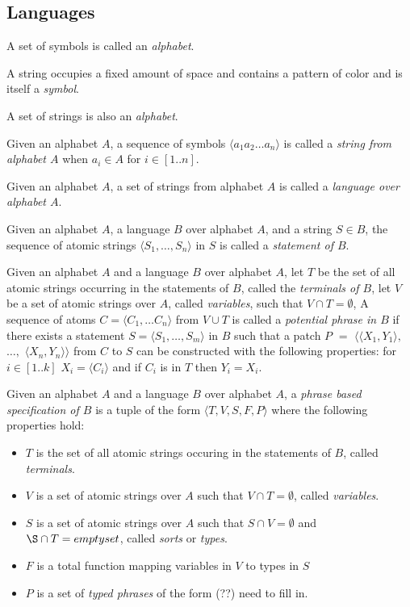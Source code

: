 \documentclass{article}
\newcommand{\nl}{\bigskip\noindent}
\newcommand{\seq}[1]{\langle #1\rangle}
\newcommand{\defcon}[1]{\emph{#1}}
\begin{document}
\subsection{Languages}

\nl A set of symbols is called an \defcon{alphabet}.


\nl A string occupies a fixed amount of space and contains a pattern of color and is itself a \defcon{symbol}.

\nl A set of strings is also an \defcon {alphabet}.


\nl Given an alphabet $A$, a sequence of symbols $\seq{a_1a_2\dots a_n}$  is called a \defcon{string from alphabet $A$}  when  $a_i\in A$ for $i\in[1..n]$.

\nl Given an alphabet $A$, a set of strings from alphabet $A$ is called a \defcon{language over alphabet $A$}.

\nl Given an alphabet $A$, a language $B$ over alphabet $A$, and a string $S\in B$, the sequence of atomic strings $\seq{S_1,\dots, S_n}$ in $S$ is called a \defcon{statement of $B$}.
 
 
\nl Given an alphabet $A$ and a language $B$ over alphabet $A$, let $T$ be the set of all atomic strings occurring in the statements of $B$, called the \defcon{terminals of $B$}, let $V$ be a set of atomic strings over $A$, called \defcon{variables}, such that $V\cap T = \emptyset$, A sequence of atoms $C = \seq{C_1, \dots C_n}$ from $V\cup T$ is called a \defcon{potential phrase in $B$} if there exists a statement $S = \seq{S_1, \dots, S_m}$ in $B$ such that a patch $P$ $=$ $\langle\seq{X_1,Y_1},$ $\dots,$ $\seq{X_n, Y_n}\rangle$ from $C$ to $S$ can be constructed with the following properties: for $i\in[1..k]$ $X_i = \seq{C_i}$ and if $C_i$ is in $T$ then $Y_i = X_i$.


\nl Given an alphabet $A$ and a language $B$ over alphabet $A$, a \defcon{phrase based specification of $B$} is a tuple of the form $\seq{T, V, S, F, P}$ where the following properties hold: 
\begin{itemize}
  \item $T$ is the set of all atomic strings occuring in the statements of $B$, called \defcon{terminals}. 
  \item $V$ is a set of atomic strings over $A$ such that $V\cap T = \emptyset$, called \defcon{variables}.
  \item $S$ is a set of atomic strings over $A$ such that $S\cap V = \emptyset$ and $\S\cap T = emptyset$, called \defcon{sorts} or \defcon{types}.
  \item $F$ is a total function mapping variables in $V$ to types in $S$
  \item $P$ is a set of \defcon{typed phrases} of the form (??) need to fill in.
\end{itemize}
\end{document}
